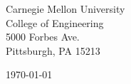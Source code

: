 \begin{minipage}{0.49\textwidth}
\begin{flushleft}
\noindent
Carnegie Mellon University\\
College of Engineering\\
5000 Forbes Ave.\\
Pittsburgh, PA 15213
\end{flushleft}
\end{minipage}
\begin{minipage}{0.47\textwidth}
\begin{flushright}
\today
\end{flushright}
\end{minipage} \\

\newcommand{\univ}{Carnegie Mellon University}
\newcommand{\univshort}{CMU}
\newcommand{\degree}{Ph.D.}
\newcommand{\dept}{Electrical and Computer Engineering}

